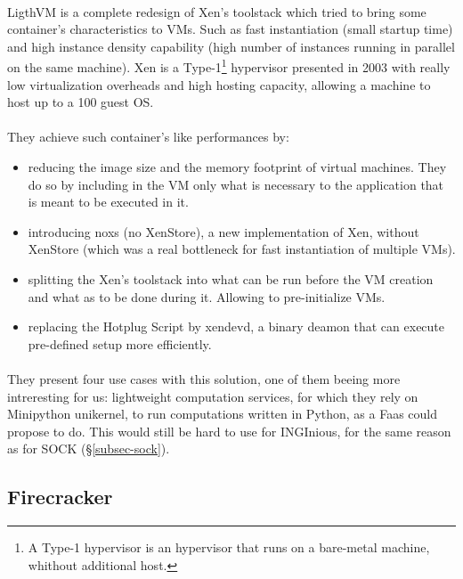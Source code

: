 \paragraph{}LigthVM is a complete redesign of Xen's toolstack which tried to bring some container's characteristics to VMs.  Such as fast instantiation (small startup time) and high instance density capability (high number of instances running in parallel on the same machine).\cite{manco2017my}  Xen is a Type-1\footnote{A Type-1 hypervisor is an hypervisor that runs on a bare-metal machine, whithout additional host.} hypervisor presented in 2003 with really low virtualization overheads and high hosting capacity, allowing a machine to host up to a 100 guest OS.\cite{barham2003xen}  
\paragraph{}They achieve such container's like performances by:
\begin{itemize}
\renewcommand\labelitemi{--}
  \item reducing the image size and the memory footprint of virtual machines.  They do so by including in the VM only what is necessary to the application that is meant to be executed in it.
  \item introducing noxs (no XenStore), a new implementation of Xen, without XenStore (which was a real bottleneck for fast instantiation of multiple VMs).
  \item splitting the Xen's toolstack into what can be run before the VM creation and what as to be done during it.  Allowing to pre-initialize VMs.
  \item replacing the Hotplug Script by xendevd, a binary deamon that can execute pre-defined setup more efficiently.
\end{itemize}

\paragraph{}They present four use cases with this solution, one of them beeing more intreresting for us: lightweight computation services, for which they rely on Minipython unikernel, to run computations written in Python, as a Faas could propose to do.  This would still be hard to use for INGInious, for the same reason as for SOCK (§\ref{subsec-sock}).

\subsection{Firecracker} 

